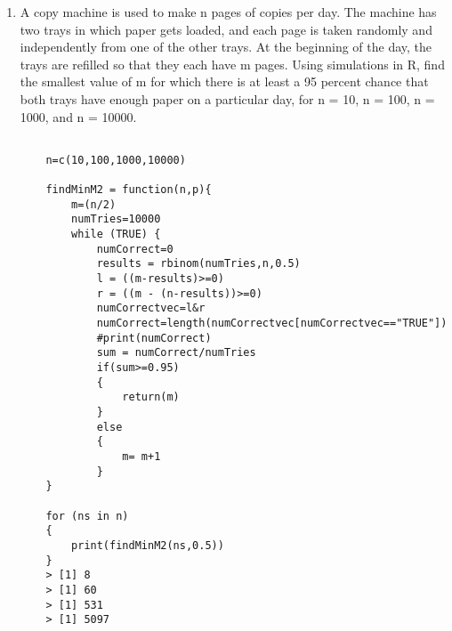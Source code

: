 \documentclass[11pt]{article}
\begin{document}
\begin{enumerate}
\item A copy machine is used to make n pages of copies per day. The machine has two trays in which paper gets
loaded, and each page is taken randomly and independently from one of the other trays. At the beginning
of the day, the trays are refilled so that they each have m pages. Using simulations in R, find the smallest
value of m for which there is at least a 95 percent chance that both trays have enough paper on a particular day,
for n = 10, n = 100, n = 1000, and n = 10000.
\begin{verbatim}

	n=c(10,100,1000,10000)

	findMinM2 = function(n,p){
		m=(n/2) 
		numTries=10000
		while (TRUE) {
			numCorrect=0
			results = rbinom(numTries,n,0.5)
			l = ((m-results)>=0)
			r = ((m - (n-results))>=0)
			numCorrectvec=l&r
			numCorrect=length(numCorrectvec[numCorrectvec=="TRUE"])
			#print(numCorrect)
			sum = numCorrect/numTries
			if(sum>=0.95)
			{
				return(m)
			}
			else
			{
				m= m+1
			}
	}
	
	for (ns in n)
	{
		print(findMinM2(ns,0.5))
	}
	> [1] 8
	> [1] 60
	> [1] 531
	> [1] 5097
\end{verbatim}

\end{enumerate}
\end{document}
